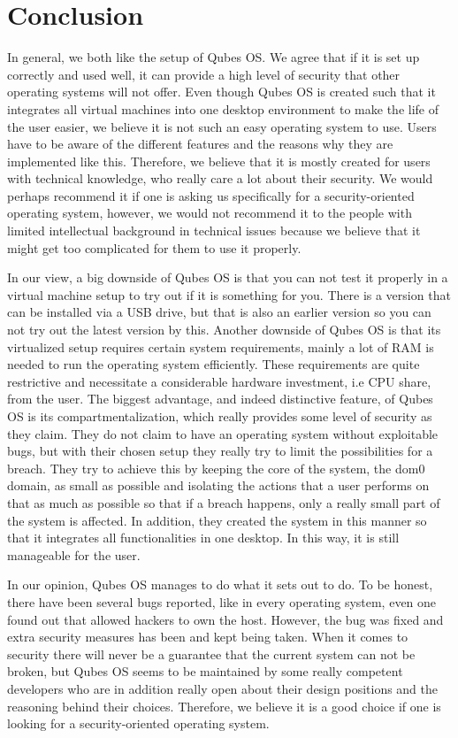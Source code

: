 \documentclass[runningheads,a4paper]{article}
\begin{document}
\section{Conclusion}
In general, we both like the setup of Qubes OS. We agree that if it is set up correctly and used well, it can provide a high level of security that other operating systems will not offer. Even though Qubes OS is created such that it integrates all virtual machines into one desktop environment to make the life of the user easier, we believe it is not such an easy operating system to use. Users have to be aware of the different features and the reasons why they are implemented like this. Therefore, we believe that it is mostly created for users with technical knowledge, who really care a lot about their security. We would perhaps recommend it if one is asking us specifically for a security-oriented operating system, however, we would not recommend it to the people with limited intellectual background in technical issues because we believe that it might get too complicated for them to use it properly.

In our view, a big downside of Qubes OS is that you can not test it properly in a virtual machine setup to try out if it is something for you. There is a version that can be installed via a USB drive, but that is also an earlier version so you can not try out the latest version by this. Another downside of Qubes OS is that its virtualized setup requires certain system requirements, mainly a lot of RAM is needed to run the operating system efficiently. These requirements are quite restrictive and necessitate a considerable hardware investment, i.e CPU share, from the user.
The biggest advantage, and indeed distinctive feature, of Qubes OS is its compartmentalization, which really provides some level of security as they claim. They do not claim to have an operating system without exploitable bugs, but with their chosen setup they really try to limit the possibilities for a breach. They try to achieve this by keeping the core of the system, the dom0 domain, as small as possible and isolating the actions that a user performs on that as much as possible so that if a breach happens, only a really small part of the system is affected. In addition, they created the system in this manner so that it integrates all functionalities in one desktop. In this way, it is still manageable for the user.

In our opinion, Qubes OS manages to do what it sets out to do. To be honest, there have been several bugs reported, like in every operating system, even one found out that allowed hackers to own the host. However, the bug was fixed and extra security measures has been and kept being taken. When it comes to security there will never be a guarantee that the current system can not be broken, but Qubes OS seems to be maintained by some really competent developers who are in addition really open about their design positions and the reasoning behind their choices. Therefore, we believe it is a good choice if one is looking for a security-oriented operating system.
\nocite{*}





\end{document}
